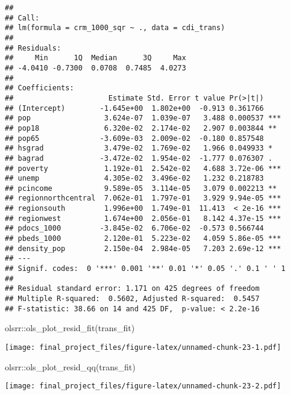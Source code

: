 \documentclass[
]{article}
\newenvironment{Shaded}{\begin{snugshade}}{\end{snugshade}}
\newcommand{\FunctionTok}[1]{\textcolor[rgb]{0.00,0.00,0.00}{#1}}
\newcommand{\NormalTok}[1]{#1}
\newcommand{\SpecialCharTok}[1]{\textcolor[rgb]{0.00,0.00,0.00}{#1}}
\begin{document}
\begin{verbatim}
## 
## Call:
## lm(formula = crm_1000_sqr ~ ., data = cdi_trans)
## 
## Residuals:
##     Min      1Q  Median      3Q     Max 
## -4.0410 -0.7300  0.0708  0.7485  4.0273 
## 
## Coefficients:
##                      Estimate Std. Error t value Pr(>|t|)    
## (Intercept)        -1.645e+00  1.802e+00  -0.913 0.361766    
## pop                 3.624e-07  1.039e-07   3.488 0.000537 ***
## pop18               6.320e-02  2.174e-02   2.907 0.003844 ** 
## pop65              -3.609e-03  2.009e-02  -0.180 0.857548    
## hsgrad              3.479e-02  1.769e-02   1.966 0.049933 *  
## bagrad             -3.472e-02  1.954e-02  -1.777 0.076307 .  
## poverty             1.192e-01  2.542e-02   4.688 3.72e-06 ***
## unemp               4.305e-02  3.496e-02   1.232 0.218783    
## pcincome            9.589e-05  3.114e-05   3.079 0.002213 ** 
## regionnorthcentral  7.062e-01  1.797e-01   3.929 9.94e-05 ***
## regionsouth         1.996e+00  1.749e-01  11.413  < 2e-16 ***
## regionwest          1.674e+00  2.056e-01   8.142 4.37e-15 ***
## pdocs_1000         -3.845e-02  6.706e-02  -0.573 0.566744    
## pbeds_1000          2.120e-01  5.223e-02   4.059 5.86e-05 ***
## density_pop         2.150e-04  2.984e-05   7.203 2.69e-12 ***
## ---
## Signif. codes:  0 '***' 0.001 '**' 0.01 '*' 0.05 '.' 0.1 ' ' 1
## 
## Residual standard error: 1.171 on 425 degrees of freedom
## Multiple R-squared:  0.5602, Adjusted R-squared:  0.5457 
## F-statistic: 38.66 on 14 and 425 DF,  p-value: < 2.2e-16
\end{verbatim}

\begin{Shaded}
\begin{Highlighting}[]
\NormalTok{olsrr}\SpecialCharTok{::}\FunctionTok{ols\_plot\_resid\_fit}\NormalTok{(trans\_fit)}
\end{Highlighting}
\end{Shaded}

\texttt{[image: final\_project\_files/figure-latex/unnamed-chunk-23-1.pdf]}

\begin{Shaded}
\begin{Highlighting}[]
\NormalTok{olsrr}\SpecialCharTok{::}\FunctionTok{ols\_plot\_resid\_qq}\NormalTok{(trans\_fit)}
\end{Highlighting}
\end{Shaded}

\texttt{[image: final\_project\_files/figure-latex/unnamed-chunk-23-2.pdf]}
\end{document}
